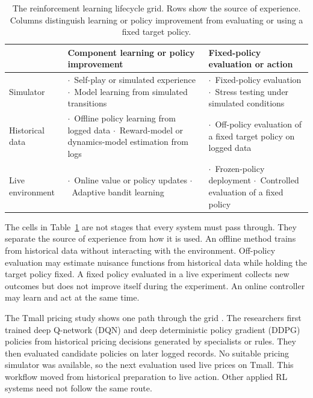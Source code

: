 \newcommand{\tabitem}{{\small$\cdot$}~}
\begin{table}[H]
\centering
\caption{The reinforcement learning lifecycle grid. Rows show the source of experience. Columns distinguish learning or policy improvement from evaluating or using a fixed target policy.}
\label{tab:lifecycle_grid}
\begin{tabular}{|>{\raggedright\arraybackslash}p{2.8cm}|>{\raggedright\arraybackslash}p{5.5cm}|>{\raggedright\arraybackslash}p{5.5cm}|}
\hline
 & Component learning or policy improvement & Fixed-policy evaluation or action \\
\hline
Simulator &
  \tabitem Self-play or simulated experience \newline
  \tabitem Model learning from simulated transitions &
  \tabitem Fixed-policy evaluation \newline
  \tabitem Stress testing under simulated conditions \\
\hline
Historical data &
  \tabitem Offline policy learning from logged data \newline
  \tabitem Reward-model or dynamics-model estimation from logs &
  \tabitem Off-policy evaluation of a fixed target policy on logged data \\
\hline
Live environment &
  \tabitem Online value or policy updates \newline
  \tabitem Adaptive bandit learning &
  \tabitem Frozen-policy deployment \newline
  \tabitem Controlled evaluation of a fixed policy \\
\hline
\end{tabular}
\end{table}

The cells in Table~\ref{tab:lifecycle_grid} are not stages that every system must pass through. They separate the source of experience from how it is used. An offline method trains from historical data without interacting with the environment. Off-policy evaluation may estimate nuisance functions from historical data while holding the target policy fixed. A fixed policy evaluated in a live experiment collects new outcomes but does not improve itself during the experiment. An online controller may learn and act at the same time.

The Tmall pricing study shows one path through the grid \citep{Liu2019}. The researchers first trained deep Q-network (DQN) and deep deterministic policy gradient (DDPG) policies from historical pricing decisions generated by specialists or rules. They then evaluated candidate policies on later logged records. No suitable pricing simulator was available, so the next evaluation used live prices on Tmall. This workflow moved from historical preparation to live action. Other applied RL systems need not follow the same route.

